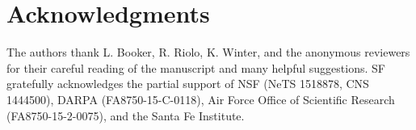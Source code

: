 \documentclass{sig-alternate}
\begin{document}

\section{Acknowledgments}

The authors thank L. Booker, R. Riolo, K. Winter, and the anonymous
reviewers for their careful reading of the manuscript and many helpful
suggestions.  SF gratefully acknowledges the partial support of NSF
(NeTS 1518878, CNS 1444500), DARPA (FA8750-15-C-0118), 
Air Force Office of Scientific Research (FA8750-15-2-0075), and the Santa Fe Institute.




\end{document}
